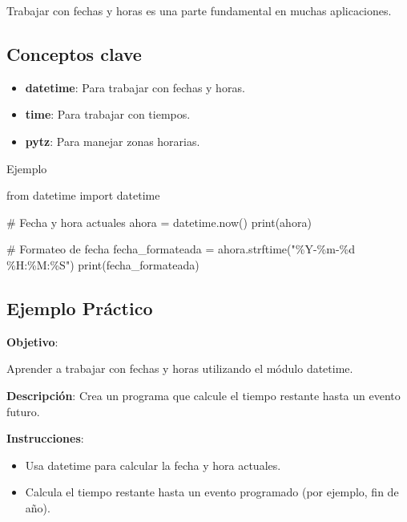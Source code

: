 \documentclass[
  a4paper,
  DIV=11,
  numbers=noendperiod,
  onepage,
  openany]{scrreprt}
\newenvironment{Shaded}{\begin{snugshade}}{\end{snugshade}}
\newcommand{\BuiltInTok}[1]{\textcolor[rgb]{0.00,0.23,0.31}{#1}}
\newcommand{\CommentTok}[1]{\textcolor[rgb]{0.37,0.37,0.37}{#1}}
\newcommand{\ImportTok}[1]{\textcolor[rgb]{0.00,0.46,0.62}{#1}}
\newcommand{\NormalTok}[1]{\textcolor[rgb]{0.00,0.23,0.31}{#1}}
\newcommand{\OperatorTok}[1]{\textcolor[rgb]{0.37,0.37,0.37}{#1}}
\newcommand{\SpecialCharTok}[1]{\textcolor[rgb]{0.37,0.37,0.37}{#1}}
\newcommand{\StringTok}[1]{\textcolor[rgb]{0.13,0.47,0.30}{#1}}
\begin{document}
Trabajar con fechas y horas es una parte fundamental en muchas
aplicaciones.

\subsection{Conceptos clave}\label{conceptos-clave-7}

\begin{itemize}
\item
  \textbf{datetime}: Para trabajar con fechas y horas.
\item
  \textbf{time}: Para trabajar con tiempos.
\item
  \textbf{pytz}: Para manejar zonas horarias.
\end{itemize}

Ejemplo

\begin{Shaded}
\begin{Highlighting}[]
\ImportTok{from}\NormalTok{ datetime }\ImportTok{import}\NormalTok{ datetime}

\CommentTok{\# Fecha y hora actuales}
\NormalTok{ahora }\OperatorTok{=}\NormalTok{ datetime.now()}
\BuiltInTok{print}\NormalTok{(ahora)}

\CommentTok{\# Formateo de fecha}
\NormalTok{fecha\_formateada }\OperatorTok{=}\NormalTok{ ahora.strftime(}\StringTok{"\%Y{-}\%m{-}}\SpecialCharTok{\%d}\StringTok{ \%H:\%M:\%S"}\NormalTok{)}
\BuiltInTok{print}\NormalTok{(fecha\_formateada)}
\end{Highlighting}
\end{Shaded}

\subsection{Ejemplo Práctico}\label{ejemplo-pruxe1ctico-8}

\textbf{Objetivo}:

Aprender a trabajar con fechas y horas utilizando el módulo datetime.

\textbf{Descripción}: Crea un programa que calcule el tiempo restante
hasta un evento futuro.

\textbf{Instrucciones}:

\begin{itemize}
\item
  Usa datetime para calcular la fecha y hora actuales.
\item
  Calcula el tiempo restante hasta un evento programado (por ejemplo,
  fin de año).
\end{itemize}
\end{document}
